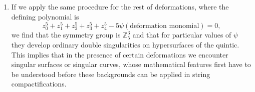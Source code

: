 \begin{enumerate}
  \item  If we apply the same procedure for the rest of deformations, where the defining polynomial is
    \begin{equation}
      z_0^5+z_1^5+z_2^5+z_3^5+z_4^5 - 5\psi(\text{deformation monomial})=0,
    \end{equation}
    we find that the symmetry group is $\mathbb Z_5^3$ and
    that for particular values of $\psi$ they develop
    ordinary double singularities on hypersurfaces of the quintic.
    This implies that in the presence of certain deformations we encounter singular surfaces or singular curves, whose mathematical features first have to be understood before these backgrounds can be applied in string compactifications.  
%
%
%
%
%
%
%
%
%
%
%
%
\end{enumerate}

